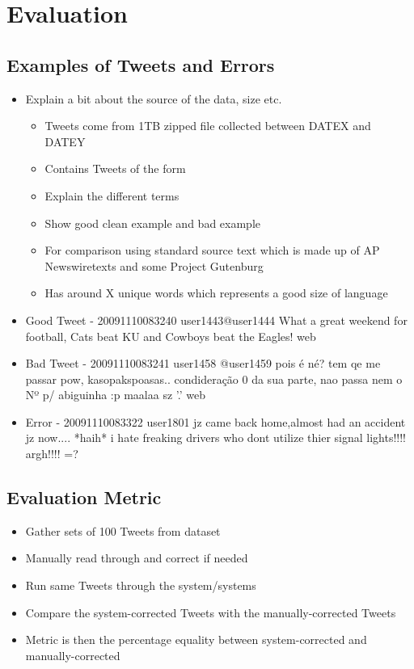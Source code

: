 \chapter{Evaluation}

\section{Examples of Tweets and Errors}
\begin{itemize}
	\item Explain a bit about the source of the data, size etc.
        \begin{itemize}
          \item Tweets come from 1TB zipped file collected between DATEX and DATEY
          \item Contains Tweets of the form
          \item Explain the different terms
          \item Show good clean example and bad example
          \item For comparison using standard source text which is made up of AP Newswiretexts and some Project Gutenburg
          \item Has around X unique words which represents a good size of language
        \end{itemize}
	\item Good Tweet - 20091110083240 user1443@user1444 What a great weekend for football, Cats beat KU and Cowboys beat the Eagles! web
        \item Bad Tweet - 20091110083241 user1458 @user1459 pois é né? tem qe me passar pow, kasopakspoasas.. condideração 0 da sua parte, nao passa nem o Nº p/ abiguinha :p maalaa sz '.' web
        \item Error - 20091110083322 user1801 jz came back home,almost had an accident jz now.... *haih* i hate freaking drivers who dont utilize thier signal lights!!!! argh!!!! =?
\end{itemize}

\section{Evaluation Metric}
\begin{itemize}
	\item Gather sets of 100 Tweets from dataset
	\item Manually read through and correct if needed
	\item Run same Tweets through the system/systems
	\item Compare the system-corrected Tweets with the manually-corrected Tweets
	\item Metric is then the percentage equality between system-corrected and manually-corrected
\end{itemize}

